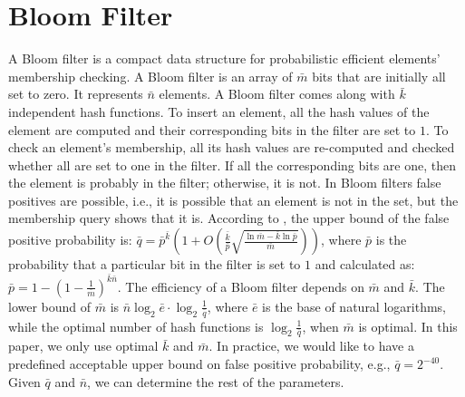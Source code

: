 


\section{Bloom Filter}\label{sec::bloom-filter-}

A Bloom filter \cite{DBLP:journals/cacm/Bloom70} is a compact data structure for probabilistic efficient  elements'  membership checking. A Bloom filter is an array of $\bar  m$ bits that are  initially all set to zero. It  represents $\bar n$  elements.  A Bloom filter comes along with  $\bar k$ independent hash functions. To insert an element, all the  hash values of the element are computed and their corresponding bits in the filter are set to $1$. To check an element's  membership, all its hash values are re-computed and checked whether all are set to one in the filter. If all the corresponding bits are one, then the element is probably in the filter; otherwise, it is not. In Bloom filters false positives are possible, i.e., it is possible that an element is not in the set, but the membership query shows that it is. According to \cite{BoseGKMMMST08}, the upper bound of the false positive probability is: $\bar q=\bar p^{\scriptscriptstyle \bar  k}(1+O(\frac{\bar k}{\bar p}\sqrt{\frac{\ln \bar m - \bar k \ln \bar  p}{\bar m}}))$,  where $\bar p$ is the probability that a particular bit in the filter is set to $1$ and calculated as: $\bar p=1-(1-\frac{1}{\bar m})^{\scriptscriptstyle \bar k\bar n}$. The efficiency of a Bloom filter depends
on  $\bar m$ and $\bar k$. The lower bound of $\bar m$  is $\bar  n \log_{\scriptscriptstyle 2}
\bar e \cdot\log_{\scriptscriptstyle 2} \frac{1}{\bar q}$, where $\bar e$ is the base of natural logarithms,  while the optimal number of hash functions is    $\log_{\scriptscriptstyle 2} \frac{1}{\bar q}$, when $\bar m$ is optimal. In this paper, we only use optimal $\bar k$ and $\bar m$. In practice, we would like to have a predefined acceptable upper bound on false positive probability, e.g., $\bar q=2^{\scriptscriptstyle - 40}$. Given $\bar q$ and $\bar n$, we can determine the rest  of the parameters. 

